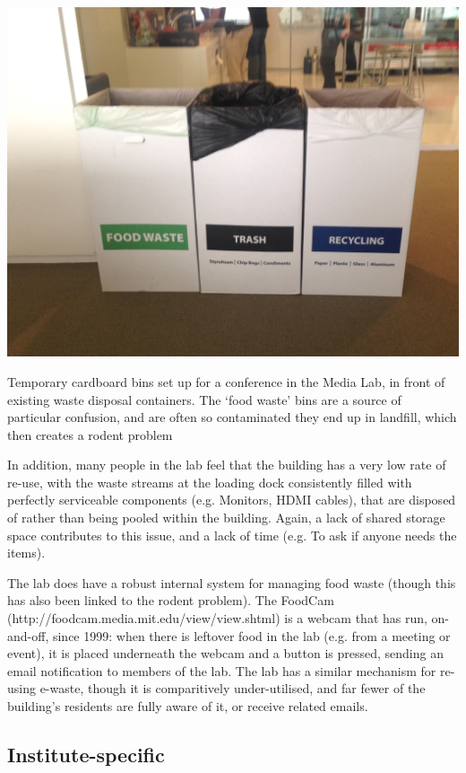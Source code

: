 \documentclass[nofonts,nols,justified,nobib]{tufte-book}
\begin{document}
\begin{marginfigure}
  \includegraphics[width=1\linewidth]{img/2/mit-bins/cardboard-bins.jpg}
  \caption{Temporary cardboard bins set up for a conference in the Media Lab, in front of existing waste disposal containers. The `food waste' bins are a source of particular confusion, and are often so contaminated they end up in landfill, which then creates a rodent problem}
\end{marginfigure}

In addition, many people in the lab feel that the building has a very low rate of re-use, with the waste streams at the loading dock consistently filled with perfectly serviceable components (e.g. Monitors, HDMI cables), that are disposed of rather than being pooled within the building. Again, a lack of shared storage space contributes to this issue, and a lack of time (e.g. To ask if anyone needs the items). 

The lab does have a robust internal system for managing food waste (though this has also been linked to the rodent problem). The FoodCam (http://foodcam.media.mit.edu/view/view.shtml) is a webcam that has run, on-and-off, since 1999: when there is leftover food in the lab (e.g. from a meeting or event), it is placed underneath the webcam and a button is pressed, sending an email notification to members of the lab. The lab has a similar mechanism for re-using e-waste, though it is comparitively under-utilised, and far fewer of the building's residents are fully aware of it, or receive related emails.

\subsection*{Institute-specific}
\end{document}
